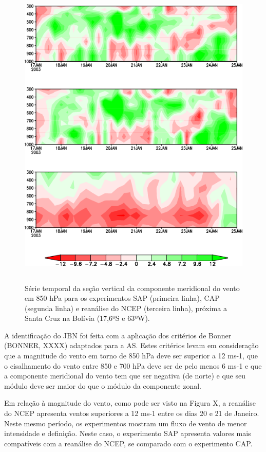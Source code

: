 \begin{figure}
\includegraphics[height=15cm]{./figs/jatos.png}
\caption{Série temporal da seção vertical da componente meridional do vento em 850 hPa para os experimentos SAP (primeira linha), CAP (segunda linha) e reanálise do NCEP (terceira linha), próxima a Santa Cruz na Bolívia (17,6ºS e 63ºW).}
\label{fig60}
\end{figure}

A identificação do JBN foi feita com a aplicação dos critérios de Bonner (BONNER, XXXX) adaptados para a AS. Estes critérios levam em consideração que a magnitude do vento em torno de 850 hPa deve ser superior a 12 ms-1, que o cisalhamento do vento entre 850 e 700 hPa deve ser de pelo menos 6 ms-1 e que a componente meridional do vento tem que ser negativa (de norte) e que seu módulo deve ser maior do que o módulo da componente zonal.

Em relação à magnitude do vento, como pode ser visto na Figura X, a reanálise do NCEP apresenta ventos superiores a 12 ms-1 entre os dias 20 e 21 de Janeiro. Neste mesmo período, os experimentos mostram um fluxo de vento de menor intensidade e definição. Neste caso, o experimento SAP apresenta valores mais compatíveis com a reanálise do NCEP, se comparado com o experimento CAP.

